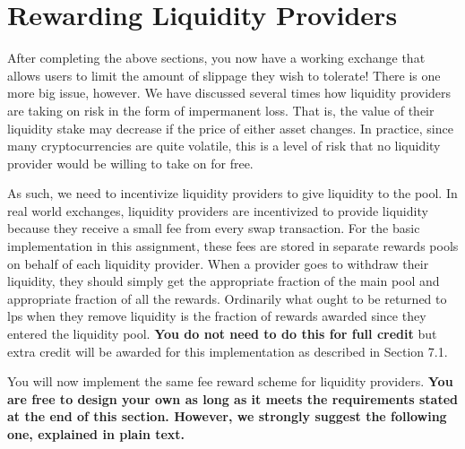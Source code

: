 \documentclass[11pt]{article}
\begin{document}
\section{Rewarding Liquidity Providers}

After completing the above sections, you now have a working exchange that allows users to limit the amount of slippage they wish to tolerate! There is one more big issue, however. We have discussed several times how liquidity providers are taking on risk in the form of impermanent loss. That is, the value of their liquidity stake may decrease if the price of either asset changes. In practice, since many cryptocurrencies are quite volatile, this is a level of risk that no liquidity provider would be willing to take on for free.

As such, we need to incentivize liquidity providers to give liquidity to the pool. In real world exchanges, liquidity providers are incentivized to provide liquidity because they receive a small fee from every swap transaction. For the basic implementation in this assignment, these fees are stored in separate rewards pools on behalf of each liquidity provider. When a provider goes to withdraw their liquidity, they should simply get the appropriate fraction of the main pool and appropriate fraction of all the rewards.
Ordinarily what ought to be returned to lps when they remove liquidity is the fraction of rewards awarded since they entered the liquidity pool. \textbf{You do not need to do this for full credit} but extra credit will be awarded for this implementation as described in Section 7.1.

You will now implement the same fee reward scheme for liquidity providers. \textbf{You are free to design your own as long as it meets the requirements stated at the end of this section. However, we strongly suggest the following one, explained in plain text.} 
\end{document}
